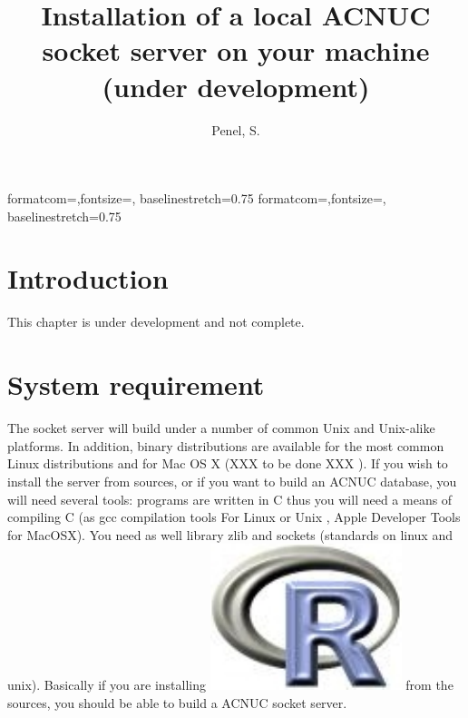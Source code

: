 \documentclass{article}
\title{Installation of a local ACNUC socket server on your machine (under development)}
\author{Penel, S.}
\begin{document}
%
%
{formatcom={\color{Sinput}},fontsize=\footnotesize, baselinestretch=0.75}
{formatcom={\color{Soutput}},fontsize=\footnotesize, baselinestretch=0.75}
%
%
\newcommand{\Rlogo}{\protect\includegraphics[height=1.8ex,keepaspectratio]{../figs/Rlogo.pdf}}
%
%
\newcommand{\seqinr}{\texttt{seqin\bf{R}}}
\newcommand{\Seqinr}{\texttt{Seqin\bf{R}}}
%
%
%
%
%


\maketitle
\tableofcontents



\section{Introduction}

This chapter is under development and not complete.

\section{System requirement}

The socket server will build under a number of common Unix and Unix-alike
platforms.  In addition, binary distributions are available for the most
common Linux distributions and for Mac OS X  (XXX to be done XXX ). If you wish
to install the server from sources, or if you want to build an ACNUC database,
you will need several tools: programs are written in C thus you will need a
means of compiling C (as gcc compilation tools For Linux or Unix , Apple
Developer Tools  for MacOSX). You need as well library zlib and sockets
(standards on linux and unix). Basically if you are installing \Rlogo{} from the
sources, you should be able to build a ACNUC socket server.
\end{document}
